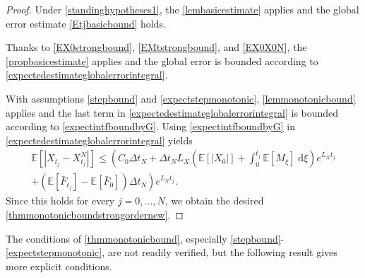 \documentclass[reqno,12pt]{amsart}
\theoremstyle{plain}%
\theoremstyle{definition}
\begin{document}
\begin{proof}
    Under \cref{standinghypotheses1}, the \cref{lembasicestimate} applies and the global error estimate \eqref{Etjbasicbound} holds.
    
    Thanks to \eqref{EX0strongbound}, \eqref{EMtstrongbound}, and \eqref{EX0X0N}, the \cref{propbasicestimate} applies and the global error is bounded according to \eqref{expectedestimateglobalerrorintegral}.
    
    With assumptions \eqref{stepbound} and \eqref{expectstepmonotonic}, \cref{lemmonotonicbound} applies and the last term in \eqref{expectedestimateglobalerrorintegral} is bounded according to \eqref{expectintfboundbyG}. Using \eqref{expectintfboundbyG} in \eqref{expectedestimateglobalerrorintegral} yields
    \begin{multline*}
        \mathbb{E} \left[|X_{t_j} - X_{t_j}^N|\right] \leq \left( C_0 \Delta t_N + \Delta t_N L_X \left(\mathbb{E}[|X_0|] + \int_0^{t_j} \mathbb{E}[M_\xi]\;\mathrm{d}\xi\right)e^{L_X t_j}\right. \\
        \left. + (\mathbb{E}[\bar F_{t_j}] - \mathbb{E}[\bar F_0])\Delta t_N\right) e^{L_X t_j}.
    \end{multline*}
    Since this holds for every $j=0, \ldots, N$, we obtain the desired \eqref{thmmonotonicboundstrongordernew}.
\end{proof}

The conditions of \cref{thmmonotonicbound}, especially \eqref{stepbound}-\eqref{expectstepmonotonic}, are not readily verified, but the following result gives more explicit conditions.
\end{document}
